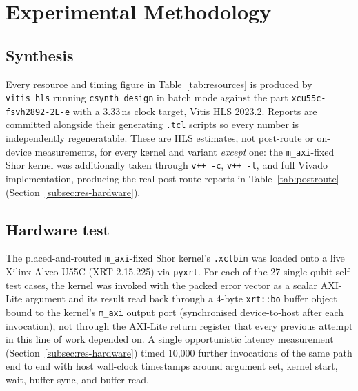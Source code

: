 \section{Experimental Methodology}\label{sec:methodology}

\subsection{Synthesis}\label{subsec:meth-synthesis}
Every resource and timing figure in Table~\ref{tab:resources} is produced by \texttt{vitis\_hls} running \texttt{csynth\_design} in batch mode against the part \texttt{xcu55c-fsvh2892-2L-e} with a 3.33\,ns clock target, Vitis HLS 2023.2. Reports are committed alongside their generating \texttt{.tcl} scripts so every number is independently regeneratable. These are HLS estimates, not post-route or on-device measurements, for every kernel and variant \emph{except} one: the \texttt{m\_axi}-fixed Shor kernel was additionally taken through \texttt{v++ -c}, \texttt{v++ -l}, and full Vivado implementation, producing the real post-route reports in Table~\ref{tab:postroute} (Section~\ref{subsec:res-hardware}).

\subsection{Hardware test}\label{subsec:meth-hw}
The placed-and-routed \texttt{m\_axi}-fixed Shor kernel's \texttt{.xclbin} was loaded onto a live Xilinx Alveo U55C (XRT 2.15.225) via \texttt{pyxrt}. For each of the 27 single-qubit self-test cases, the kernel was invoked with the packed error vector as a scalar AXI-Lite argument and its result read back through a 4-byte \texttt{xrt::bo} buffer object bound to the kernel's \texttt{m\_axi} output port (synchronised device-to-host after each invocation), not through the AXI-Lite return register that every previous attempt in this line of work depended on. A single opportunistic latency measurement (Section~\ref{subsec:res-hardware}) timed 10,000 further invocations of the same path end to end with host wall-clock timestamps around argument set, kernel start, wait, buffer sync, and buffer read.

